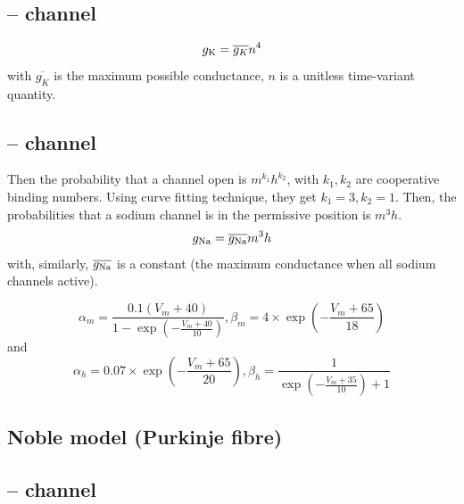 \subsection{--  channel}
\label{sec:cek+-channel}

\begin{equation}
  \label{eq:59}
  \begin{split}
    g_{\ce{K}} &= \overline{g_K} n^4  \\
  \end{split}
\end{equation}
with $\overline{g_K}$ is the maximum possible conductance, $n$ is a
unitless time-variant quantity.

\subsection{--  channel}
\label{sec:cena+-channel}

Then the probability that a channel open is $m^{k_1}h^{k_2}$, with
$k_1,k_2$ are cooperative binding numbers. Using curve fitting
technique, they get $k_1=3,k_2=1$. Then, the probabilities
that a sodium channel is in the permissive position is $m^3h$.
\begin{equation}
  \label{eq:157}
  g_{\ce{Na}} = \overline{g_{\ce{Na}}} m^3 h
\end{equation}
with, similarly, $\overline{g_{\ce{Na}}}$ is a constant (the maximum
conductance when all sodium channels active).  

\begin{equation}
  \label{eq:353_copy}
  \alpha_m = \frac{0.1(V_m+40)}{1-\exp(-\frac{V_m+40}{10})} ,
  \beta_m = 4 \times \exp(-\frac{V_m+65}{18})
\end{equation}
and
\begin{equation}
  \label{eq:354_copy}
  \alpha_h = 0.07\times \exp (-\frac{V_m+65}{20})  ,
  \beta_h = \frac{1}{\exp(-\frac{V_m+35}{10}) + 1}
\end{equation}

\subsection{Noble model (Purkinje fibre)}

\subsection{--  channel}
\label{sec:cena+-channel-1}

